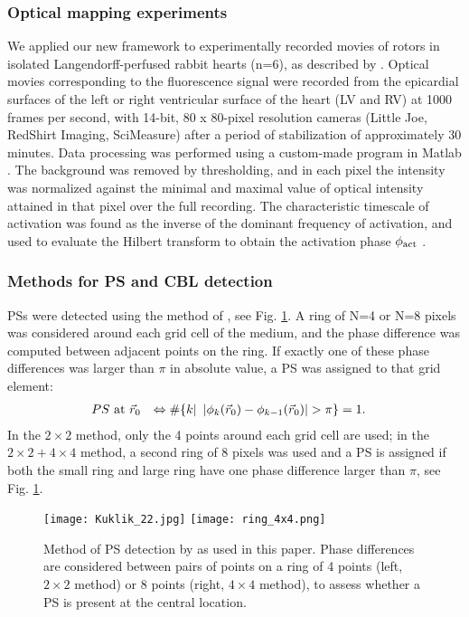 \documentclass{article}
\newcommand{\phiact}{\ensuremath{\phi_{\rm act}}}
\begin{document}
\subsubsection{Optical mapping experiments} \label{sec:opticalmappingmethods} 

We applied our new framework to experimentally recorded movies of rotors in isolated Langendorff-perfused rabbit hearts (n=6), as described by \cite{Kulkarni:2018}. Optical movies corresponding
to the fluorescence signal were recorded from
the epicardial surfaces of the left or right ventricular surface of the heart (LV
and RV) at 1000 frames per second, with 14-bit,
80 x 80-pixel resolution cameras (Little Joe, RedShirt
Imaging, SciMeasure) after a period of stabilization of
approximately 30 minutes.  Data processing was performed using a custom-made program in Matlab \cite{matlab:2020}. The background was removed by thresholding, and in each pixel the intensity was normalized against the minimal and maximal value of optical intensity attained in that pixel over the full recording. The characteristic timescale of activation was found as the inverse of the  dominant frequency of activation, and used to evaluate the Hilbert transform to obtain the activation phase $\phiact$ \citep{Bray:2002}. 

\subsubsection{Methods for PS and CBL detection} \label{sec:PDLmethods} 

PSs were detected using the method of \cite{Kuklik:2017}, see Fig. \ref{fig:PSdetection}. A ring of N=4 or N=8 pixels was considered around each grid cell of the medium, and the phase difference was computed between adjacent points on the ring. If exactly one of these phase differences was larger than $\pi$ in absolute value, a PS was assigned to that grid element:
\begin{align}
PS\ \rm{at}&\  \vec{r}_0    &\Leftrightarrow   \# \{ k |\   \left| \phi_k(\vec{r}_0) - \phi_{k-1}(\vec{r}_0) \right| > \pi \} &=1. 
\end{align}
In the $2\times 2$ method, only the 4 points around each grid cell are used; in the $2\times 2 + 4 \times 4$ method, a second ring of 8 pixels was used and a PS is assigned if both the small ring and large ring have one phase difference larger than $\pi$, see Fig. \ref{fig:PSdetection}.  

\begin{figure}
    \centering
    \texttt{[image: Kuklik\_22.jpg]}
    \texttt{[image: ring\_4x4.png]}
    \caption{Method of PS detection by \cite{Kuklik:2017} as used in this paper. Phase differences are considered between pairs of points on a ring of 4 points (left, $2\times 2$ method) or 8 points (right, $4\times 4$ method), to assess whether a PS is present at the central location. }
    \label{fig:PSdetection}
\end{figure}
    
\end{document}
